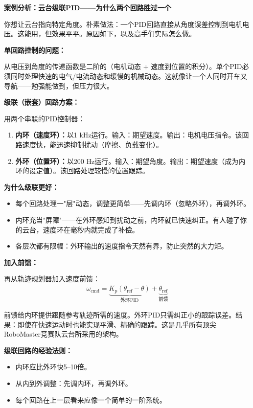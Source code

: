 \vspace{0.5em}
\begin{mdframed}[linewidth=1pt, innertopmargin=10pt, innerbottommargin=10pt]
\textbf{案例分析：云台级联PID——为什么两个回路胜过一个}

\vspace{0.3em}
你想让云台指向特定角度。朴素做法：一个PID回路直接从角度误差控制到电机电压。这能用，但效果平平。原因如下，以及高手们实际怎么做。

\textbf{单回路控制的问题：}

从电压到角度的传递函数是二阶的（电机动态 + 速度到位置的积分）。单个PID必须同时处理快速的电气/电流动态和缓慢的机械动态。这就像让一个人同时开车又导航——勉强能做到，但压力很大。

\textbf{级联（嵌套）回路方案：}

用两个串联的PID控制器：
\begin{enumerate}[nosep]
    \item \textbf{内环（速度环）：}以1 kHz运行。输入：期望速度。输出：电机电压指令。该回路速度快，能迅速抑制扰动（摩擦、负载变化）。
    \item \textbf{外环（位置环）：}以200 Hz运行。输入：期望角度。输出：期望速度（成为内环的设定值）。该回路处理较慢的位置跟踪。
\end{enumerate}

\textbf{为什么级联更好：}
\begin{itemize}[nosep]
    \item 每个回路处理一"层"动态，调整更简单——先调内环（忽略外环），再调外环。
    \item 内环充当"屏障"——在外环感知到扰动之前，内环就已快速纠正。有人碰了你的云台，速度环在毫秒内就完成了补偿。
    \item 各层次都有限幅：外环输出的速度指令天然有界，防止突然的大力矩。
\end{itemize}

\textbf{加入前馈：}

再从轨迹规划器加入速度前馈：
\[
\omega_{\text{cmd}} = \underbrace{K_p(\theta_{\text{ref}} - \theta)}_{\text{外环PID}} + \underbrace{\dot{\theta}_{\text{ref}}}_{\text{前馈}}
\]

前馈给内环提供跟随参考轨迹所需的速度。外环PID只需纠正小的跟踪误差。结果：即使在快速运动时也能实现平滑、精确的跟踪。这是几乎所有顶尖RoboMaster竞赛队云台所采用的架构。

\textbf{级联回路的经验法则：}
\begin{itemize}[nosep]
    \item 内环应比外环快5--10倍。
    \item 从内到外调整：先调内环，再调外环。
    \item 每个回路在上一层看来应像一个简单的一阶系统。
\end{itemize}
\end{mdframed}

